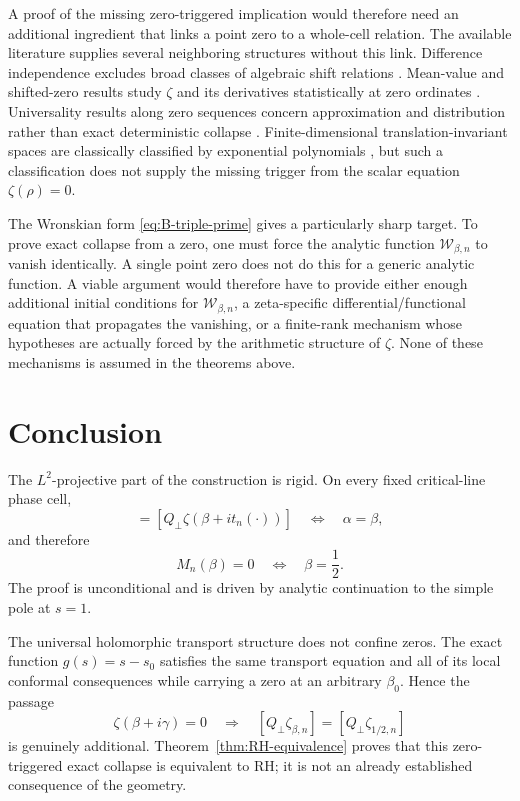 \documentclass[11pt]{amsart}
\numberwithin{equation}{section}
\begin{document}
A proof of the missing zero-triggered implication would therefore need an
additional ingredient that links a point zero to a whole-cell relation.  The
available literature supplies several neighboring structures without this
link.  Difference independence excludes broad classes of algebraic shift
relations \cite{ChiangFeng2006}.  Mean-value and shifted-zero results study
$\zeta$ and its derivatives statistically at zero ordinates
\cite{Gonek1984}.  Universality results along zero sequences concern
approximation and distribution rather than exact deterministic collapse
\cite{GarunkstisLaurincikasMacaitiene2017,Laurincikas2019}.  Finite-dimensional
translation-invariant spaces are classically classified by exponential
polynomials \cite{AnseloneKorevaar1964}, but such a classification does not
supply the missing trigger from the scalar equation $\zeta(\rho)=0$.

The Wronskian form \eqref{eq:B-triple-prime} gives a particularly sharp target.
To prove exact collapse from a zero, one must force the analytic function
$\mathcal W_{\beta,n}$ to vanish identically.  A single point zero does not do
this for a generic analytic function.  A viable argument would therefore have
to provide either enough additional initial conditions for
$\mathcal W_{\beta,n}$, a zeta-specific differential/functional equation that
propagates the vanishing, or a finite-rank mechanism whose hypotheses are
actually forced by the arithmetic structure of $\zeta$.  None of these
mechanisms is assumed in the theorems above.

\section{Conclusion}
\label{sec:conclusion}

The $L^2$-projective part of the construction is rigid.  On every fixed
critical-line phase cell,
\begin{equation}
 [Q_\perp\zeta(\alpha+i t_n(\cdot))]
 =
 [Q_\perp\zeta(\beta+i t_n(\cdot))]
 \quad\Longleftrightarrow\quad
 \alpha=\beta,
 \label{eq:conclusion-rigidity}
\end{equation}
and therefore
\begin{equation}
 M_n(\beta)=0
 \quad\Longleftrightarrow\quad
 \beta=\frac12.
 \label{eq:conclusion-M}
\end{equation}
The proof is unconditional and is driven by analytic continuation to the
simple pole at $s=1$.

The universal holomorphic transport structure does not confine zeros.  The
exact function $g(s)=s-s_0$ satisfies the same transport equation and all of
its local conformal consequences while carrying a zero at an arbitrary
$\beta_0$.  Hence the passage
\begin{equation}
 \zeta(\beta+i\gamma)=0
 \quad\Longrightarrow\quad
 [Q_\perp\zeta_{\beta,n}]=[Q_\perp\zeta_{1/2,n}]
 \label{eq:conclusion-missing-step}
\end{equation}
is genuinely additional.  Theorem~\ref{thm:RH-equivalence} proves that this
zero-triggered exact collapse is equivalent to RH; it is not an already
established consequence of the geometry.
\end{document}
